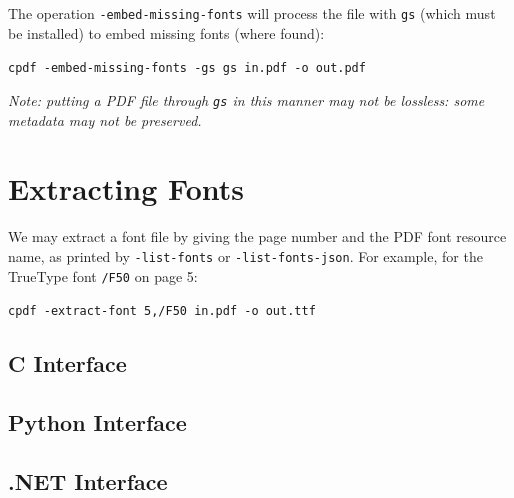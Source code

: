 \documentclass{book}
\begin{document}
\noindent The operation \texttt{-embed-missing-fonts} will process the file with \texttt{gs} (which must be installed) to embed missing fonts (where found):

  \begin{framed}
  \small\noindent\verb!cpdf -embed-missing-fonts -gs gs in.pdf -o out.pdf!
  \end{framed}

\noindent\textit{Note: putting a PDF file through \texttt{gs} in this manner may not be lossless: some metadata may not be preserved.}

\section{Extracting Fonts}

We may extract a font file by giving the page number and the PDF font resource name, as printed by \texttt{-list-fonts} or \texttt{-list-fonts-json}. For example, for the TrueType font \texttt{/F50} on page 5:

  \begin{framed}
  \small\noindent\verb!cpdf -extract-font 5,/F50 in.pdf -o out.ttf!
  \end{framed}

\begin{cpdflib}
\clearpage
\section*{C Interface}
\begin{small}\tt

\end{small}
\end{cpdflib}

\begin{pycpdflib}
\clearpage
\section*{Python Interface}
\begin{small}\tt

\end{small}
\end{pycpdflib}

\begin{dotnetcpdflib}
\clearpage
\section*{.NET Interface}
\begin{small}\tt

\end{small}
\end{dotnetcpdflib}
\end{document}

